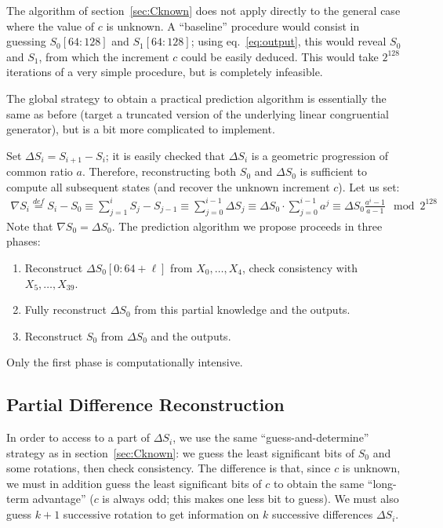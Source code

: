\documentclass[preprint,svgnames]{iacrtrans}
\begin{document}
The algorithm of section~\ref{sec:Cknown} does not apply directly to the general
case where the value of $c$ is unknown. A ``baseline'' procedure would consist
in guessing $S_0[64:128]$ and $S_1[64:128]$; using eq.~\eqref{eq:output}, this
would reveal $S_0$ and $S_1$, from which the increment $c$ could be easily
deduced. This would take $2^{128}$ iterations of a very simple procedure, but is
completely infeasible.

The global strategy to obtain a practical prediction algorithm is essentially
the same as before (target a truncated version of the underlying linear
congruential generator), but is a bit more complicated to implement.

Set $\Delta S_i = S_{i+1} - S_i$; it is easily checked that $\Delta S_i$ is a
geometric progression of common ratio $a$. Therefore, reconstructing both $S_0$
and $\Delta S_0$ is sufficient to compute all subsequent states (and recover the
unknown increment $c$). Let us set:
\begin{align*}
  \nabla S_i \stackrel{def}{=} S_i - S_0 \equiv \sum_{j=1}^i S_j - S_{j-1} \equiv \sum_{j=0}^{i-1} \Delta S_j \equiv \Delta S_0 \cdot \sum_{j=0}^{i-1} a^j \equiv \Delta S_0 \frac{a^i-1}{a-1} \mod 2^{128}
\end{align*}
Note that $\nabla S_0 = \Delta S_0$. The prediction algorithm we propose proceeds in three phases:
\begin{enumerate}
\item Reconstruct $\Delta S_0[0:64+\ell]$ from $X_0, \dots, X_{4}$, check consistency with $X_5, \dots, X_{39}$.
\item Fully reconstruct $\Delta S_0$ from this partial knowledge and the outputs.
\item Reconstruct $S_0$ from $\Delta S_0$ and the outputs.
\end{enumerate}

\noindent Only the first phase is computationally intensive. 

\subsection{Partial Difference Reconstruction}

In order to access to a part of $\Delta S_i$, we use the same
``guess-and-determine'' strategy as in section~\ref{sec:Cknown}: we guess the
least significant bits of $S_0$ and some rotations, then check consistency. The
difference is that, since $c$ is unknown, we must in addition guess the least
significant bits of $c$ to obtain the same ``long-term advantage'' ($c$ is
always odd; this makes one less bit to guess). We must also guess $k+1$
successive rotation to get information on $k$ successive differences
$\Delta S_i$.
\end{document}
